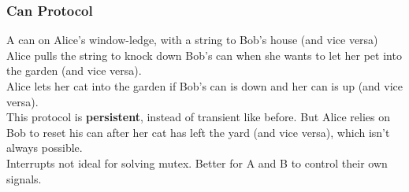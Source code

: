 \documentclass{article}
\begin{document}
\subsubsection{Can Protocol}
A can on Alice's window-ledge, with a string to Bob's house (and vice versa)
\\Alice pulls the string to knock down Bob's can when she wants to let her pet into the garden (and vice versa).
\\Alice lets her cat into the garden if Bob's can is down and her can is up (and vice versa).
\\This protocol is \textbf{persistent}, instead of transient like before. But Alice relies on Bob to reset his can after her cat has left the yard (and vice versa), which isn't always possible.
\\Interrupts not ideal for solving mutex. Better for A and B to control their own signals.
\end{document}
